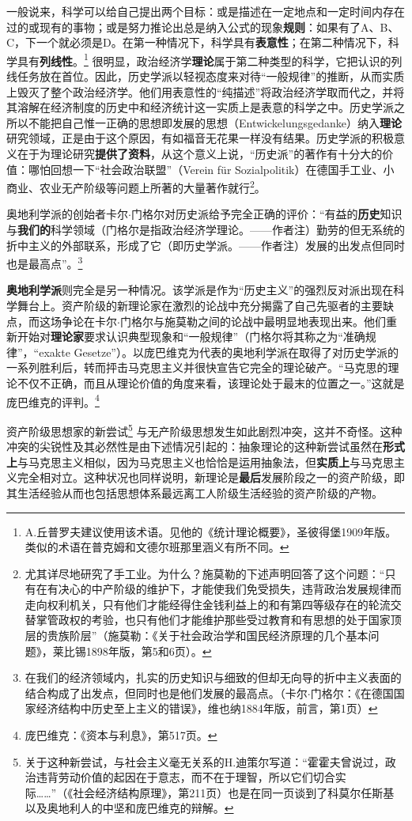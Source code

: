 \documentclass[fontset=fandol, a4paper, 12pt, openright]{ctexbook}
\begin{document}
一般说来，科学可以给自己提出两个目标：或是描述在一定地点和一定时间内存在过的或现有的事物；或是努力推论出总是纳入公式的现象\textbf{规则}：如果有了A、B、C，下一个就必须是D。在第一种情况下，科学具有\textbf{表意性}；在第二种情况下，科学具有\textbf{列线性}。\footnote{A.丘普罗夫建议使用该术语。见他的《统计理论概要》，圣彼得堡1909年版。类似的术语在普克姆和文德尔班那里涵义有所不同。} 很明显，政治经济学\textbf{理论}属于第二种类型的科学，它把认识的列线任务放在首位。因此，历史学派以轻视态度来对待“一般规律”的推断，从而实质上毁灭了整个政治经济学。他们用表意性的“纯描述”将政治经济学取而代之，并将其溶解在经济制度的历史中和经济统计这一实质上是表意的科学之中。历史学派之所以不能把自己惟一正确的思想即发展的思想（Entwickelungsgedanke）纳入\textbf{理论}研究领域，正是由于这个原因，有如福音无花果一样没有结果。历史学派的积极意义在于为理论研究\textbf{提供了资料}，从这个意义上说，“历史派”的著作有十分大的价值：哪怕回想一下“社会政治联盟”（Verein f\"{u}r Sozialpolitik）在德国手工业、小商业、农业无产阶级等问题上所著的大量著作就行\footnote{尤其详尽地研究了手工业。为什么？施莫勒的下述声明回答了这个问题：“只有在有决心的中产阶级的维护下，才能使我们免受损失，违背政治发展规律而走向权利机关，只有他们才能经得住金钱利益上的和有第四等级存在的轮流交替掌管政权的考验，也只有他们才能维护那些受过教育和有思想的处于国家顶层的贵族阶层”（施莫勒：《关于社会政治学和国民经济原理的几个基本问题》，莱比锡1898年版，第5和6页）。}。

奥地利学派的创始者卡尔$\cdot$门格尔对历史派给予完全正确的评价：“有益的\textbf{历史}知识与\textbf{我们的}科学领域（门格尔是指政治经济学理论。——作者注）勤劳的但无系统的折中主义的外部联系，形成了它（即历史学派。——作者注）发展的出发点但同时也是最高点”。\footnote{在我们的经济领域内，扎实的历史知识与细致的但却无向导的折中主义表面的结合构成了出发点，但同时也是他们发展的最高点。（卡尔$\cdot$门格尔：《在德国国家经济结构中历史至上主义的错误》，维也纳1884年版，前言，第1页）}

\textbf{奥地利学派}则完全是另一种情况。该学派是作为“历史主义”的强烈反对派出现在科学舞台上。资产阶级的新理论家在激烈的论战中充分揭露了自己先驱者的主要缺点，而这场争论在卡尔$\cdot$门格尔与施莫勒之间的论战中最明显地表现出来。他们重新开始对\textbf{理论家}要求认识典型现象和“一般规律”（门格尔将其称之为“准确规律”，“exakte Gesetze”）。以庞巴维克为代表的奥地利学派在取得了对历史学派的一系列胜利后，转而抨击马克思主义并很快宣告它完全的理论破产。“马克思的理论不仅不正确，而且从理论价值的角度来看，该理论处于最末的位置之一。”这就是庞巴维克的评判。\footnote{庞巴维克：《资本与利息》，第517页。}

资产阶级思想家的新尝试\footnote{关于这种新尝试，与社会主义毫无关系的H.迪策尔写道：“霍霍夫曾说过，政治违背劳动价值的起因在于意志，而不在于理智，所以它们切合实际……”（《社会经济结构原理》，第211页）也是在同一页谈到了科莫尔任斯基以及奥地利人的中坚和庞巴维克的辩解。} 与无产阶级思想发生如此剧烈冲突，这并不奇怪。这种冲突的尖锐性及其必然性是由下述情况引起的：抽象理论的这种新尝试虽然在\textbf{形式上}与马克思主义相似，因为马克思主义也恰恰是运用抽象法，但\textbf{实质上}与马克思主义完全相对立。这种状况也同样说明，新理论是\textbf{最后}发展阶段之一的资产阶级，即其生活经验从而也包括思想体系最远离工人阶级生活经验的资产阶级的产物。
\end{document}
